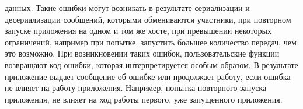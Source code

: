 \begin{enumerate}
        данных.
        \newpar
        Такие ошибки могут возникать в результате сериализации и
        десериализации сообщений, которыми обмениваются участники, при
        повторном запуске приложения на одном и том же хосте, при
        превышении некоторых ограничений, например при попытке, запустить
        большее количество передач, чем это возможно. При возникновении
        таких ошибок, пользовательские функции возвращают код ошибки,
        которая интерпретируется особым образом. В результате приложение
        выдает сообщение об ошибке или продолжает работу, если ошибка не
        влияет на работу приложения. Например, попытка повторного запуска
        приложения, не влияет на ход работы первого, уже запущенного
        приложения.
\end{enumerate}

\setcounter{figure}{0}
